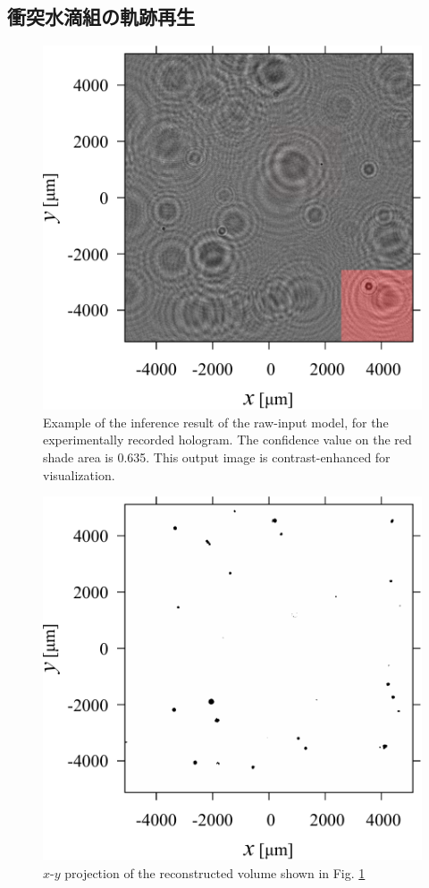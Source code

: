 \subsection{衝突水滴組の軌跡再生}

\begin{figure}[H]
    \centering
    \includegraphics[width=0.8\linewidth]{./Figure/4_Results/exp/visout.pdf}
    \caption{Example of the inference result of the raw-input model, for the experimentally recorded hologram. The confidence value on the red shade area is \num{0.635}. This output image is contrast-enhanced for visualization.}
    \label{fig:expInfResult}
\end{figure}

\begin{figure}[H]
    \centering
    \includegraphics[width=0.8\linewidth]{./Figure/4_Results/exp/imp.pdf}
    \caption{$x$-$y$ projection of the reconstructed volume shown in Fig. \ref{fig:expInfResult}}
    \label{fig:expHoloImp}
\end{figure}

